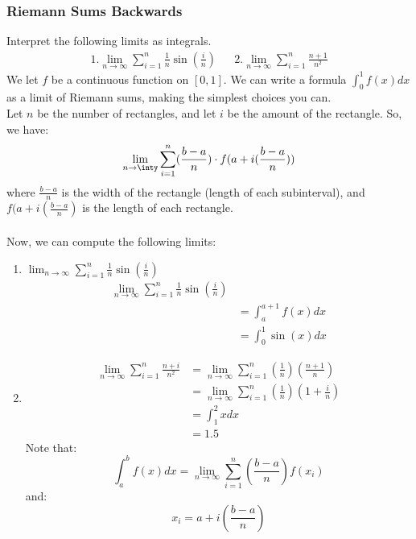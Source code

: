 \documentclass{article}
\begin{document}
\subsubsection{Riemann Sums Backwards}
Interpret the following limits as integrals.
\begin{align*} 
1. \lim_{n \to \infty}\sum_{i=1}^{n}  \frac{1}{n}\sin(\frac{i}{n}) & & 2. \lim_{n \to \infty}\sum_{i=1}^{n} \frac{n + 1}{n^2} 
\end{align*}
We let $f$ be a continuous function on $[0,1]$. We can write a formula $\int_{0}^{1}f(x)dx$ as a limit of Riemann sums, making the simplest choices you can.\\
Let $n$ be the number of rectangles, and let $i$ be the amount of the rectangle.
So, we have:
$$\lim_{n\to\inty} \sum_{i=1}^{n}(\frac{b-a}{n}) \cdot f(a + i(\frac{b-a}{n}))$$
where $\frac{b-a}{n}$ is the width of the rectangle (length of each subinterval), and $f(a + i(\frac{b-a}{n})$ is the length of each rectangle.\\
\\
Now, we can compute the following limits:
\begin{enumerate}
    \item $\lim_{n \to \infty}\sum_{i=1}^{n}  \frac{1}{n}\sin(\frac{i}{n})$
    \begin{align*}
        \lim_{n \to \infty}\sum_{i=1}^{n}  \frac{1}{n}\sin(\frac{i}{n}) &\\
        & = \int_a^{a+1} f(x) dx\\
        & = \int_0^1 \sin(x) dx
    \end{align*}
    
    \item
    \begin{align*}
        \lim_{n\to\infty}\sum_{i=1}^{n}\frac{n+i}{n^2} & = \lim_{n\to\infty}\sum_{i=1}^{n} (\frac{1}{n})(\frac{n+1}{n})\\
        & = \lim_{n\to\infty}\sum_{i=1}^n(\frac{1}{n})(1+\frac{i}{n})\\
        & = \int_1^2 x dx\\
        & = 1.5
    \end{align*}
    Note that:
    $$\int_a^b f(x)dx = \lim_{n\to \infty} \sum_{i=1}^n (\frac{b-a}{n})f(x_i)$$
    and:
    $$x_i = a + i(\frac{b-a}{n})$$
\end{enumerate}
\end{document}
